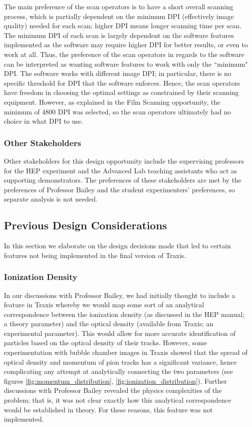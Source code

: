 \documentclass[12pt]{article} %
\begin{document}
The main preference of the scan operators is to have a short overall scanning process, which is partially dependent on the minimum DPI (effectively image quality) needed for each scan; higher DPI means longer scanning time per scan. The minimum DPI of each scan is largely dependent on the software features implemented as the software may require higher DPI for better results, or even to work at all. Thus, the preference of the scan operators in regards to the software can be interpreted as wanting software features to work with only the ``minimum" DPI. The software works with different image DPI; in particular, there is no specific threshold for DPI that the software enforces. Hence, the scan operators have freedom in choosing the optimal settings as constrained by their scanning equipment. However, as explained in the Film Scanning opportunity, the minimum of 4800 DPI was selected, so the scan operators ultimately had no choice in what DPI to use.  

\subsubsection{Other Stakeholders}
Other stakeholders for this design opportunity include the supervising professors for the HEP experiment and the Advanced Lab teaching assistants who act as supporting demonstrators. The preferences of these stakeholders are met by the preferences of Professor Bailey and the student experimenters' preferences, so separate analysis is not needed.

\subsection{Previous Design Considerations}\label{sec:previous_design_considerations}
In this section we elaborate on the design decisions made that led to certain features not being implemented in the final version of Traxis.

\subsubsection{Ionization Density} \label{section: ionizationenergy}
In our discussions with Professor Bailey, we had initially thought to include a feature in Traxis whereby we would map some sort of an analytical correspondence between the ionization density (as discussed in the HEP manual; a theory parameter) and the optical density (available from Traxis; an experimental parameter). This would allow for more accurate identification of particles based on the optical density of their tracks. However, some experimentation with bubble chamber images in Traxis showed that the spread of optical density and momentum of pion tracks has a significant variance, hence complicating any attempt at analytically connecting the two parameters (see figures \ref{fig:momentum_distribution}, \ref{fig:ionization_distribution}). Further discussions with Professor Bailey revealed the physics complexities of the problem; that is, it was not clear exactly how this analytical correspondence would be established in theory. For these reasons, this feature was not implemented.
\end{document}
